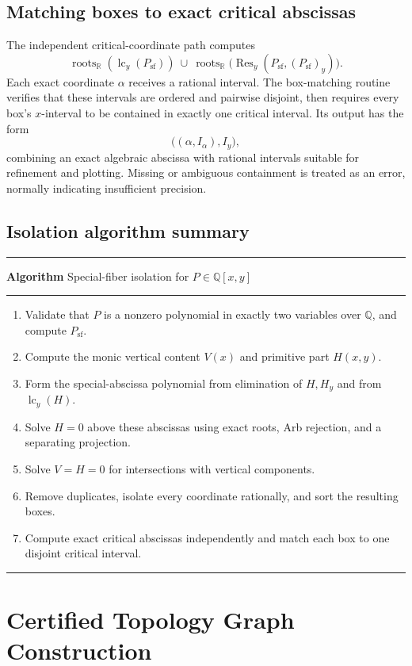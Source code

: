 \documentclass[11pt,a4paper]{article}
\newcounter{algorithm}
\newenvironment{reportalgorithm}[1]{%
  \refstepcounter{algorithm}%
  \par\medskip\noindent
  \begin{minipage}{\textwidth}
  \hrule\vspace{0.35em}
  \textbf{Algorithm \thealgorithm}\quad #1
  \vspace{0.2em}\hrule\vspace{0.35em}
  \begin{enumerate}[leftmargin=2em,itemsep=0.16em,topsep=0.2em]
}{%
  \end{enumerate}
  \vspace{0.1em}\hrule
  \end{minipage}
  \par\medskip
}
\newcommand{\QQ}{\mathbb{Q}}
\newcommand{\RR}{\mathbb{R}}
\newcommand{\Res}{\operatorname{Res}}
\newcommand{\lc}{\operatorname{lc}}
\begin{document}
\subsection{Matching boxes to exact critical abscissas}

The independent critical-coordinate path computes
\[
  \operatorname{roots}_{\RR}(\lc_y(P_{\mathrm{sf}}))
  \ \cup\ 
  \operatorname{roots}_{\RR}
  \bigl(\Res_y(P_{\mathrm{sf}},(P_{\mathrm{sf}})_y)\bigr).
\]
Each exact coordinate $\alpha$ receives a rational interval. The box-matching
routine verifies that these intervals are ordered and pairwise disjoint, then
requires every box's $x$-interval to be contained in exactly one critical
interval. Its output has the form
\[
  \bigl((\alpha,I_{\alpha}),I_y\bigr),
\]
combining an exact algebraic abscissa with rational intervals suitable for
refinement and plotting. Missing or ambiguous containment is treated as an
error, normally indicating insufficient precision.

\subsection{Isolation algorithm summary}

\begin{reportalgorithm}{Special-fiber isolation for $P\in\QQ[x,y]$}
  \item Validate that $P$ is a nonzero polynomial in exactly two variables
        over $\QQ$, and compute $P_{\mathrm{sf}}$.
  \item Compute the monic vertical content $V(x)$ and primitive part $H(x,y)$.
  \item Form the special-abscissa polynomial from elimination of
        $H,H_y$ and from $\lc_y(H)$.
  \item Solve $H=0$ above these abscissas using exact roots, Arb rejection,
        and a separating projection.
  \item Solve $V=H=0$ for intersections with vertical components.
  \item Remove duplicates, isolate every coordinate rationally, and sort the
        resulting boxes.
  \item Compute exact critical abscissas independently and match each box to
        one disjoint critical interval.
\end{reportalgorithm}


\section{Certified Topology Graph Construction}
\end{document}
